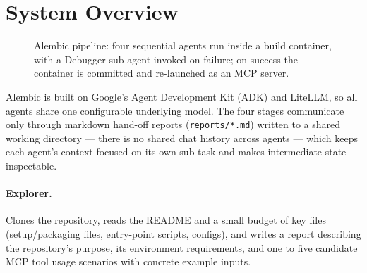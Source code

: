 \section{System Overview}
\label{sec:system}

\begin{figure}[t]
  \centering
  \caption{Alembic pipeline: four sequential agents run inside a build container, with a Debugger sub-agent invoked on failure; on success the container is committed and re-launched as an MCP server.}
  \label{fig:pipeline}
\end{figure}

Alembic is built on Google's Agent Development Kit (ADK) and LiteLLM, so all agents share one configurable underlying model. The four stages communicate only through markdown hand-off reports (\texttt{reports/*.md}) written to a shared working directory — there is no shared chat history across agents — which keeps each agent's context focused on its own sub-task and makes intermediate state inspectable.

\paragraph{Explorer.} Clones the repository, reads the README and a small budget of key files (setup/packaging files, entry-point scripts, configs), and writes a report describing the repository's purpose, its environment requirements, and one to five candidate MCP tool usage scenarios with concrete example inputs.

